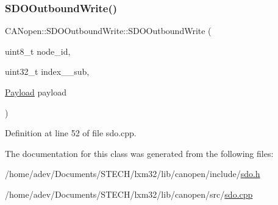 \subsubsection{\texorpdfstring{S\+D\+O\+Outbound\+Write()}{SDOOutboundWrite()}\hspace{0.1cm}{\footnotesize\ttfamily [2/2]}}
{\footnotesize\ttfamily C\+A\+Nopen\+::\+S\+D\+O\+Outbound\+Write\+::\+S\+D\+O\+Outbound\+Write (\begin{DoxyParamCaption}\item[{uint8\+\_\+t}]{node\+\_\+id,  }\item[{uint32\+\_\+t}]{index\+\_\+\+\_\+sub,  }\item[{\hyperlink{class_c_a_nopen_1_1_payload}{Payload}}]{payload }\end{DoxyParamCaption})}



Definition at line 52 of file sdo.\+cpp.



The documentation for this class was generated from the following files\+:\begin{DoxyCompactItemize}
\item 
/home/adev/\+Documents/\+S\+T\+E\+C\+H/lxm32/lib/canopen/include/\hyperlink{sdo_8h}{sdo.\+h}\item 
/home/adev/\+Documents/\+S\+T\+E\+C\+H/lxm32/lib/canopen/src/\hyperlink{sdo_8cpp}{sdo.\+cpp}\end{DoxyCompactItemize}
